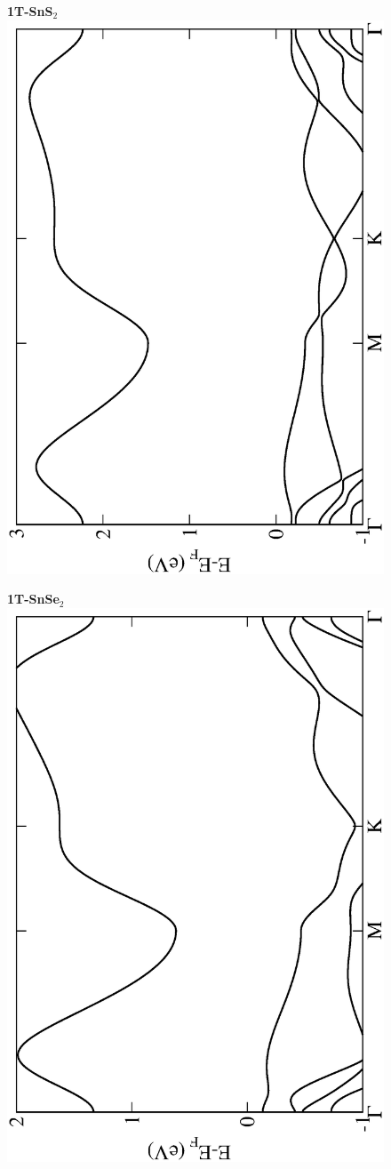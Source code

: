 \begin{figure}[htbp]
\centering
{\bfseries \sffamily 1T-SnS$_{2}$}\\
\includegraphics[width=0.45\linewidth, angle=-90, trim={2.9cm, 0cm, 2cm, 0cm}, clip]{img/SI_figs/BS/1T-SnS2.eps}
\end{figure}

\begin{figure}[htbp]
\centering
{\bfseries \sffamily 1T-SnSe$_{2}$}\\
\includegraphics[width=0.45\linewidth, angle=-90, trim={2.9cm, 0cm, 2cm, 0cm}, clip]{img/SI_figs/BS/1T-SnSe2.eps}
\end{figure}

